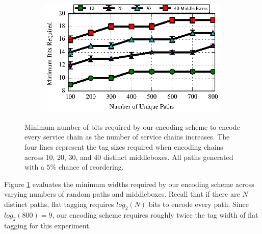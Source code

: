 \begin{figure}[t!] 
\begin{minipage}{1\linewidth}
\begin{subfigure}[b]{0.96\linewidth}
\includegraphics[width=\linewidth]{figures/service_chaining_minbits_ordered}
\end{subfigure} 
\end{minipage} 
\caption{Minimum number of bits required by our encoding scheme to encode every service chain as the number of service chains increases. The four lines represent the tag sizes required when encoding chains across 10, 20, 30, and 40 distinct middleboxes. All paths generated with a $5\%$ chance of reordering.}
\label{fig:chain_bits}
\end{figure}

Figure \ref{fig:chain_bits} evaluates the minimum widths required by our encoding scheme across varying numbers of random paths and middleboxes. Recall that if there are $N$ distinct paths, flat tagging requires $log_2(N)$ bits to encode every path. Since $log_2(800) = 9$, our encoding scheme requires roughly twice the tag width of flat tagging for this experiment. 


